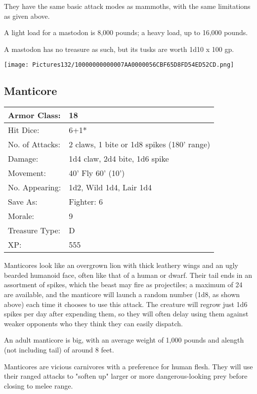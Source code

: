 \documentclass[a4paper,twoside,openany,10pt]{book}
\begin{document}
\begin{multicols}{2}
They have the same basic attack modes as mammoths, with the same limitations as given above.

A light load for a mastodon is 8,000 pounds; a heavy load, up to 16,000 pounds.

A mastodon has no treasure as such, but its tusks are worth 1d10 x 100 gp.

\begin{center} \texttt{[image: Pictures132/10000000000007AA0000056CBF65D8FD54ED52CD.png]} \end{center}


\subsection*{Manticore}\label{manticore}

\begin{tabularx}{0.50\textwidth}{@{}lX@{}}
Armor Class: & 18 \\\hline
Hit Dice: & 6+1* \\\hline
No. of Attacks: & 2 claws, 1 bite or 1d8 spikes (180' range) \\\hline
Damage: & 1d4 claw, 2d4 bite, 1d6 spike \\\hline
Movement: & 40' Fly 60' (10') \\\hline
No. Appearing: & 1d2, Wild 1d4, Lair 1d4 \\\hline
Save As: & Fighter: 6 \\\hline
Morale: & 9 \\\hline
Treasure Type: & D \\\hline
XP: & 555 \\\hline
\end{tabularx}\medskip

Manticores look like an overgrown lion with thick leathery wings and an ugly bearded humanoid face, often like that of a human or dwarf. Their tail ends in an assortment of spikes, which the beast may fire as projectiles; a maximum of 24 are available, and the manticore will launch a random number (1d8, as shown above) each time it chooses to use this attack. The creature will regrow just 1d6 spikes per day after expending them, so they will often delay using them against weaker opponents who they think they can easily dispatch.

An adult manticore is big, with an average weight of 1,000 pounds and alength (not including tail) of around 8 feet.

Manticores are vicious carnivores with a preference for human flesh. They will use their ranged attacks to "soften up" larger or more dangerous-looking prey before closing to melee range.


\end{multicols}
\end{document}
